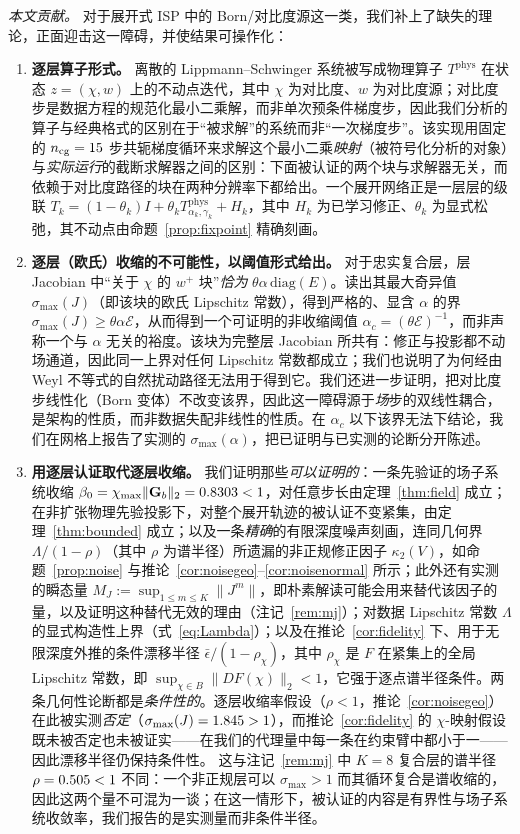 \documentclass[UTF8,a4paper,11pt]{ctexart}
\newcommand{\norm}[1]{\lVert #1 \rVert}
\newcommand{\numv}[1]{#1}
\begin{document}
\emph{本文贡献。} 对于展开式 ISP 中的 Born/对比度源这一类，我们补上了缺失的理论，正面迎击这一障碍，并使结果可操作化：
\begin{enumerate}
\item \textbf{逐层算子形式。} 离散的 Lippmann--Schwinger 系统被写成物理算子 $T^{\mathrm{phys}}$ 在状态 $z=(\chi,w)$ 上的不动点迭代，其中 $\chi$ 为对比度、$w$ 为对比度源；对比度步是数据方程的规范化最小二乘解，而非单次预条件梯度步，因此我们分析的算子与经典格式的区别在于“被求解”的系统而非“一次梯度步”。该实现用固定的 $n_{\mathrm{cg}}=\numv{\NumNCg}$ 步共轭梯度循环来求解这个最小二乘\emph{映射}（被符号化分析的对象）与\emph{实际运行}的截断求解器之间的区别：下面被认证的两个块与求解器无关，而依赖于对比度路径的块在两种分辨率下都给出。一个展开网络正是一层层的级联
$T_k = (1-\theta_k)I+\theta_k T^{\mathrm{phys}}_{\alpha_k,\gamma_k} + H_k$，其中 $H_k$ 为已学习修正、$\theta_k$ 为显式松弛，其不动点由命题~\ref{prop:fixpoint} 精确刻画。
\item \textbf{逐层（欧氏）收缩的不可能性，以阈值形式给出。} 对于忠实复合层，层 Jacobian 中“关于 $\chi$ 的 $w^{+}$ 块”\emph{恰为}
$\theta\alpha\,\mathrm{diag}(E)$。读出其最大奇异值
$\sigma_{\max}(J)$（即该块的欧氏 Lipschitz 常数），得到严格的、显含 $\alpha$ 的界 $\sigma_{\max}(J)\ge\theta\alpha\mathcal{E}$，从而得到一个可证明的非收缩阈值 $\alpha_c=(\theta\mathcal{E})^{-1}$，而非声称一个与 $\alpha$ 无关的裕度。该块为完整层 Jacobian 所共有：修正与投影都不动场通道，因此同一上界对任何 Lipschitz 常数都成立；我们也说明了为何经由 Weyl 不等式的自然扰动路径无法用于得到它。我们还进一步证明，把对比度步线性化（Born 变体）不改变该界，因此这一障碍源于\emph{场}步的双线性耦合，是架构的性质，而非数据失配非线性的性质。在 $\alpha_c$ 以下该界无法下结论，我们在网格上报告了实测的 $\sigma_{\max}(\alpha)$，把已证明与已实测的论断分开陈述。
\item \textbf{用逐层认证取代逐层收缩。}
我们证明那些\emph{可以证明的}：一条先验证的场子系统收缩
$\beta_0=\chi_{\max}\norm{\mathbf{G}_b}_2=\numv{\betacert}<1$，对任意步长由定理~\ref{thm:field} 成立；在非扩张物理先验投影下，对整个展开轨迹的被认证不变紧集，由定理~\ref{thm:bounded} 成立；以及一条\emph{精确}的有限深度噪声刻画，连同几何界 $\Lambda/(1-\rho)$（其中 $\rho$ 为谱半径）所遗漏的非正规修正因子 $\kappa_2(V)$，如命题~\ref{prop:noise} 与推论~\ref{cor:noisegeo}--\ref{cor:noisenormal} 所示；此外还有实测的瞬态量 $M_J:=\sup_{1\le m\le K}\norm{J^m}$，即朴素解读可能会用来替代该因子的量，以及证明这种替代无效的理由（注记~\ref{rem:mj}）；对数据 Lipschitz 常数 $\Lambda$ 的显式构造性上界（式~\eqref{eq:Lambda}）；以及在推论~\ref{cor:fidelity} 下、用于无限深度外推的条件漂移半径 $\bar\epsilon/(1-\rho_\chi)$，其中
$\rho_\chi$ 是 $F$ 在紧集上的全局 Lipschitz 常数，即 $\sup_{\chi\in B}\norm{DF(\chi)}_2<1$，它强于逐点谱半径条件。两条几何性论断都是\emph{条件性的}。逐层收缩率假设（$\rho<1$，推论~\ref{cor:noisegeo}）在此被实测\emph{否定}（$\sigma_{\max}(J)=\numv{\NumPhysSigma}>1$），而推论~\ref{cor:fidelity} 的 $\chi$-映射假设既未被否定也未被证实——在我们的代理量中每一条在约束臂中都小于一——因此漂移半径仍保持条件性。
这与注记~\ref{rem:mj} 中 $K{=}8$ 复合层的谱半径 $\rho=\numv{\NumRhoComp}<1$ 不同：一个非正规层可以 $\sigma_{\max}>1$ 而其循环复合是谱收缩的，因此这两个量不可混为一谈；在这一情形下，被认证的内容是有界性与场子系统收敛率，我们报告的是实测量而非条件半径。


\end{enumerate}
\end{document}
